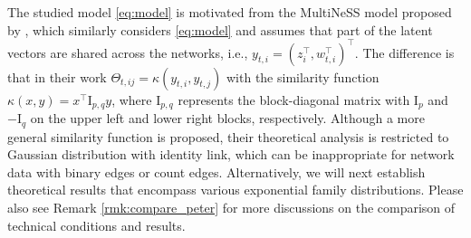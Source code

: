 \documentclass[12pt]{article}
\newcommand{\blue}[1]{\textcolor{blue}{#1}}
\begin{document}
The studied model \eqref{eq:model}  is motivated from the MultiNeSS model proposed by \cite{macdonald2022latent}, which 
similarly considers \eqref{eq:model} and assumes  that part of the latent vectors are shared across the networks, i.e., $y_{t,i}=(z_i^{\top},w_{t,i}^{\top})^{\top}$.  
The difference is that in their work $\Theta_{t,ij}=\kappa(y_{t,i},y_{t,j})$ 
with the similarity function $\kappa(x, y) = x^{\top}\mathrm{I}_{p,q}y$, where $\mathrm{I}_{p,q}$ represents the block-diagonal matrix with $\mathrm{I}_p$ and $-\mathrm{I}_{q}$ on the upper left and lower right blocks, respectively.  %
Although a more general similarity function is proposed,
their theoretical analysis is restricted to Gaussian distribution with identity link, which  can be  inappropriate for network data with binary edges or count edges. 
Alternatively, we will next establish theoretical results that encompass various exponential family distributions. 
Please also see Remark \ref{rmk:compare_peter} for more discussions on the comparison of technical conditions and results.  
\end{document}

